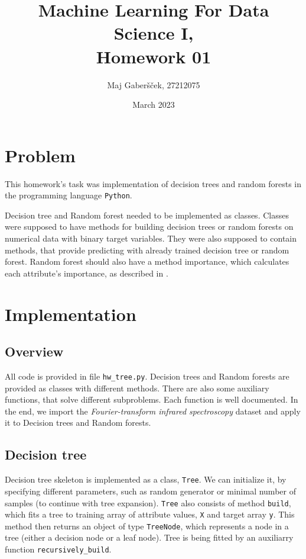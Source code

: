 \documentclass{article}
\title{Machine Learning For Data Science I, \\[0.1cm] Homework 01}
\author{Maj Gaberšček, 27212075}
\date{March 2023}
\begin{document}
\maketitle

\section{Problem}

This homework's task was implementation of decision trees and random forests in the programming language \texttt{Python}.

Decision tree and Random forest needed to be implemented as classes. Classes were supposed to have methods for building decision trees or random forests on numerical data with binary target variables. They were also supposed to contain methods, that provide predicting with already trained decision tree or random forest. Random forest should also have a method importance, which calculates each attribute's importance, as described in \cite{rand_for}.

\section{Implementation}

\subsection{Overview}

All code is provided in file \texttt{hw\_tree.py}. Decision trees and Random forests are provided as classes with different methods. There are also some auxiliary functions, that solve different subproblems. Each function is well documented. In the end, we import the \emph{Fourier-transform infrared spectroscopy} dataset and apply it to Decision trees and Random forests. 

\subsection{Decision tree}

Decision tree skeleton is implemented as a class, \texttt{Tree}. We can initialize it, by specifying different parameters, such as random generator or minimal number of samples (to continue with tree expansion). \texttt{Tree} also consists of method \texttt{build}, which fits a tree to training array of attribute values, \texttt{X} and target array \texttt{y}. This method then returns an object of type \texttt{TreeNode}, which represents a node in a tree (either a decision node or a leaf node). Tree is being fitted by an auxiliarry function \texttt{recursively\_build}.
\end{document}
